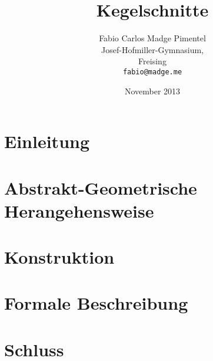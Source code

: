 \documentclass[12pt, a4paper]{report}
\title{Kegelschnitte}
\author{Fabio Carlos Madge Pimentel\\
  Josef-Hofmiller-Gymnasium,\\
  Freising\\
  \texttt{fabio@madge.me}}
\date{November 2013}
\begin{document}


\setcounter{page}{2}
\tableofcontents
\clearpage

\chapter*{Einleitung}


\chapter{Abstrakt-Geometrische Herangehensweise}
	

\chapter{Konstruktion}
	

\chapter{Formale Beschreibung}
	

\chapter*{Schluss}





%

\clearpage

\end{document}
